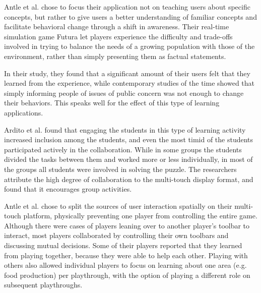 Antle et al.\citep{AntleFutura} chose to focus their application not on teaching users about specific concepts, but rather to give users a better understanding of familiar concepts and facilitate behavioral change through a shift in awareness. Their real-time simulation game Futura let players experience the difficulty and trade-offs involved in trying to balance the needs of a growing population with those of the environment, rather than simply presenting them as factual statements.

In their study, they found that a significant amount of their users felt that they learned from the experience, while contemporary studies of the time showed that simply informing people of issues of public concern was not enough to change their behaviors. This speaks well for the effect of this type of learning applications.

Ardito et al. found that engaging the students in this type of learning activity increased inclusion among the students, and even the most timid of the students participated actively in the collaboration. While in some groups the students divided the tasks between them and worked more or less individually, in most of the groups all students were involved in solving the puzzle. The researchers attribute the high degree of collaboration to the multi-touch display format, and found that it encourages group activities.

Antle et al. chose to split the sources of user interaction spatially on their multi-touch platform, physically preventing one player from controlling the entire game. Although there were cases of players leaning over to another player's toolbar to interact, most players collaborated by controlling their own toolbars and discussing mutual decisions. Some of their players reported that they learned from playing together, because they were able to help each other. Playing with others also allowed individual players to focus on learning about one area (e.g. food production) per playthrough, with the option of playing a different role on subsequent playthroughs.



